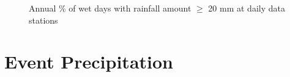 \begin{figure}[htbp]

  \caption{Annual \% of wet days with rainfall amount $\geq$ 20 mm at
daily data stations}
  \label{fig:FF_annual_R20p}
\end{figure}

\section{Event Precipitation}
\label{sec:EventRainfallData}

